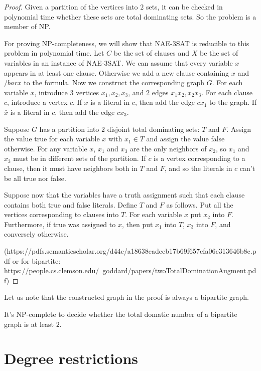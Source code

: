 \begin{proof}
  Given a partition of the vertices into $2$ sets, it can be checked in polynomial
  time whether these sets are total dominating sets. So the problem is a member
  of NP.

  For proving NP-completeness, we will show that NAE-3SAT is reducible to this problem
  in polynomial time. Let $C$ be the set of clauses and $X$ be the set of variables
  in an instance of NAE-3SAT. We can assume that every variable $x$ appears in at least
  one clause. Otherwise we add a new clause containing $x$ and $/bar{x}$ to
  the formula. Now we construct the corresponding graph $G$. For each variable $x$,
  introduce $3$ vertices $x_1, x_2, x_3$, and $2$ edges $x_1x_2, x_2x_3$. For each
  clause $c$, introduce a vertex $c$. If $x$ is a literal in $c$, then add the edge
  $cx_1$ to the graph. If $\bar{x}$ is a literal in $c$, then add the edge $cx_3$.

  Suppose $G$ has a partition into $2$ disjoint total dominating sets: $T$ and $F$.
  Assign the value true for each variable $x$ with $x_1 \in T$ and assign the value
  false otherwise. For any variable $x$, $x_1$ and $x_3$ are the only neighbors
  of $x_2$, so $x_1$ and $x_3$ must be in different sets of the partition. If $c$
  is a vertex corresponding to a clause, then it must have neighbors both in $T$
  and $F$, and so the literals in $c$ can't be all true nor false.

  Suppose now that the variables have a truth assignment such that each clause
  contains both true and false literals. Define $T$ and $F$ as follows. Put all
  the vertices corresponding to clauses into $T$. For each variable $x$ put $x_2$
  into $F$. Furthermore, if true was assigned to $x$, then put $x_1$ into $T$, $x_3$
  into $F$, and conversely otherwise.


  (https://pdfs.semanticscholar.org/d44c/a18638eadeeb17b69f657cfa06c313646b8c.pdf
  or for bipartite:
  https://people.cs.clemson.edu/~goddard/papers/twoTotalDominationAugment.pdf)
\end{proof}

Let us note that the constructed graph in the proof is always a bipartite
graph.

\begin{cor}
  It's NP-complete to decide whether the total domatic number of
  a bipartite graph is at least $2$.
\end{cor}


\section{Degree restrictions}

